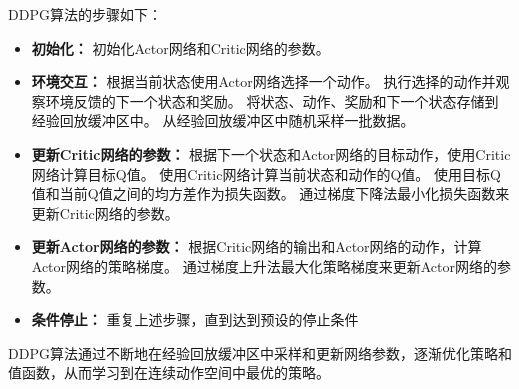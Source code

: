 DDPG算法的步骤如下：
\begin{itemize}
  \item \textbf{初始化：} 初始化Actor网络和Critic网络的参数。
  \item \textbf{环境交互：} 根据当前状态使用Actor网络选择一个动作。
  执行选择的动作并观察环境反馈的下一个状态和奖励。
  将状态、动作、奖励和下一个状态存储到经验回放缓冲区中。
  从经验回放缓冲区中随机采样一批数据。
  \item \textbf{更新Critic网络的参数：} 根据下一个状态和Actor网络的目标动作，使用Critic网络计算目标Q值。
  使用Critic网络计算当前状态和动作的Q值。
  使用目标Q值和当前Q值之间的均方差作为损失函数。
  通过梯度下降法最小化损失函数来更新Critic网络的参数。
  \item \textbf{更新Actor网络的参数：} 根据Critic网络的输出和Actor网络的动作，计算Actor网络的策略梯度。
  通过梯度上升法最大化策略梯度来更新Actor网络的参数。
  \item \textbf{条件停止：} 重复上述步骤，直到达到预设的停止条件
\end{itemize}

DDPG算法通过不断地在经验回放缓冲区中采样和更新网络参数，逐渐优化策略和值函数，从而学习到在连续动作空间中最优的策略。
